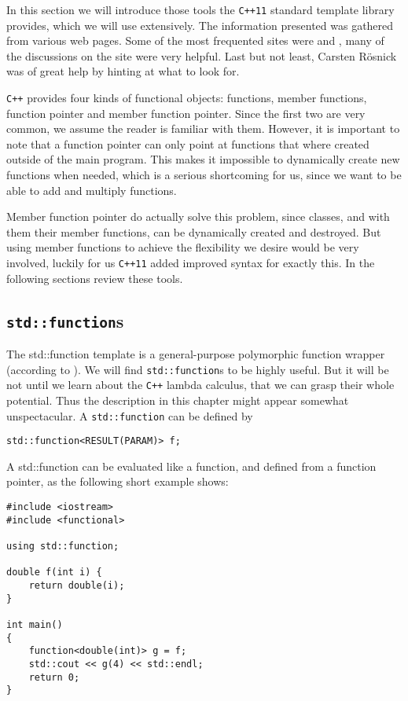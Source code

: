 \documentclass{article}
\newcommand{\cc}{\texttt{C++}\xspace}
\newcommand{\ccOx}{\texttt{C++11}\xspace}
\newcommand{\code}[1]{\texttt{#1}}
\begin{document}
In this section we will introduce those tools the \ccOx standard template library provides, which we will use extensively. The information presented was gathered from various web pages. Some of the most frequented sites were \cite{cppreference} and \cite{cplusplus}, many of the discussions on the site \cite{stackoverflow} were very helpful. Last but not least, Carsten Rösnick was of great help by hinting at what to look for.

\cc provides four kinds of functional objects: functions, member functions, function pointer and member function pointer. Since the first two are very common, we assume the reader is familiar with them. However, it is important to note that a function pointer can only point at functions that where created outside of the main program. This makes it impossible to dynamically create new functions when needed, which is a serious shortcoming for us, since we want to be able to add and multiply functions.

Member function pointer do actually solve this problem, since classes, and with them their member functions, can be dynamically created and destroyed. But using member functions to achieve the flexibility we desire would be very involved, luckily for us \ccOx added improved syntax for exactly this. In the following sections review these tools.

\subsection{\code{std::function}s}\label{sec: std::functions}

The std::function template is a general-purpose polymorphic function wrapper (according to \cite{cppreference}). We will find \code{std::function}s to be highly useful. But it will be not until we learn about the \cc lambda calculus, that we can grasp their whole potential. Thus the description in this chapter might appear somewhat unspectacular. A \code{std::function} can be defined by
\begin{lstlisting}
std::function<RESULT(PARAM)> f;
\end{lstlisting}

A std::function can be evaluated like a function, and defined from a function pointer, as the following short example shows:
\begin{lstlisting}
#include <iostream>
#include <functional>

using std::function;

double f(int i) {
	return double(i);
}

int main()
{
	function<double(int)> g = f;
	std::cout << g(4) << std::endl;
	return 0;
}
\end{lstlisting}
\end{document}

